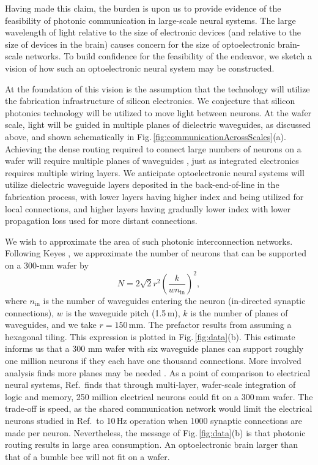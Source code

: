 \documentclass[twocolumn]{article}
\begin{document}
Having made this claim, the burden is upon us to provide evidence of the feasibility of photonic communication in large-scale neural systems. The large wavelength of light relative to the size of electronic devices (and relative to the size of devices in the brain) causes concern for the size of optoelectronic brain-scale networks. To build confidence for the feasibility of the endeavor, we sketch a vision of how such an optoelectronic neural system may be constructed.

At the foundation of this vision is the assumption that the technology will utilize the fabrication infrastructure of silicon electronics. We conjecture that silicon photonics technology will be utilized to move light between neurons. At the wafer scale, light will be guided in multiple planes of dielectric waveguides, as discussed above, and shown schematically in Fig.\,\ref{fig:communicationAcrossScales}(a). Achieving the dense routing required to connect large numbers of neurons on a wafer will require multiple planes of waveguides \cite{chbu2017,chbu2018}, just as integrated electronics requires multiple wiring layers. We anticipate optoelectronic neural systems will utilize dielectric waveguide layers deposited in the back-end-of-line in the fabrication process, with lower layers having higher index and being utilized for local connections, and higher layers having gradually lower index with lower propagation loss used for more distant connections. 

We wish to approximate the area of such photonic interconnection networks. Following Keyes \cite{ke1982}, we approximate the number of neurons that can be supported on a 300-mm wafer by
\begin{equation}
\label{eq:numNeuronPerWafer}
N = 2\sqrt{2}r^2\left(\frac{k}{wn_{\mathrm{in}}}\right)^2,
\end{equation}
where $n_{\mathrm{in}}$ is the number of waveguides entering the neuron (in-directed synaptic connections), $w$ is the waveguide pitch (1.5\,\textmu m), $k$ is the number of planes of waveguides, and we take $r = 150$\,mm. The prefactor results from assuming a hexagonal tiling. This expression is plotted in Fig.\,\ref{fig:data}(b). This estimate informs us that a 300 mm wafer with six waveguide planes can support roughly one million neurons if they each have one thousand connections. More involved analysis finds more planes may be needed \cite{sh2018_full}. As a point of comparison to electrical neural systems, Ref.\,\cite{kuwa2017} finds that through multi-layer, wafer-scale integration of logic and memory, 250 million electrical neurons could fit on a 300\,mm wafer. The trade-off is speed, as the shared communication network would limit the electrical neurons studied in Ref.\,\cite{kuwa2017} to 10\,Hz operation when 1000 synaptic connections are made per neuron. Nevertheless, the message of Fig.\,\ref{fig:data}(b) is that photonic routing results in large area consumption. An optoelectronic brain larger than that of a bumble bee will not fit on a wafer.
\end{document}
